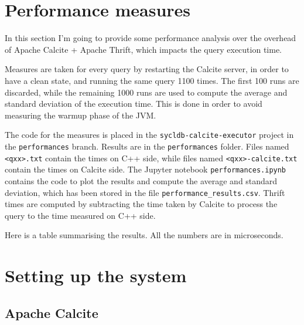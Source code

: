 \documentclass[a4paper, 10pt]{article}
\begin{document}
\section{Performance measures} \label{performances}

In this section I'm going to provide some performance analysis over the overhead of Apache Calcite + Apache Thrift, which impacts the query execution time.

Measures are taken for every query by restarting the Calcite server, in order to have a clean state, and running the same query 1100 times. The first 100 runs are discarded, while the remaining 1000 runs are used to compute the average and standard deviation of the execution time. This is done in order to avoid measuring the warmup phase of the JVM.

The code for the measures is placed in the \texttt{sycldb-calcite-executor} project in the \texttt{performances} branch. Results are in the \texttt{performances} folder. Files named \texttt{<qxx>.txt} contain the times on C++ side, while files named \texttt{<qxx>-calcite.txt} contain the times on Calcite side. The Jupyter notebook \texttt{performances.ipynb} contains the code to plot the results and compute the average and standard deviation, which has been stored in the file \texttt{performance\_results.csv}. Thrift times are computed by subtracting the time taken by Calcite to process the query to the time measured on C++ side.

Here is a table summarising the results. All the numbers are in microseconds.


\section{Setting up the system} \label{setup}

\subsection{Apache Calcite}
\end{document}
